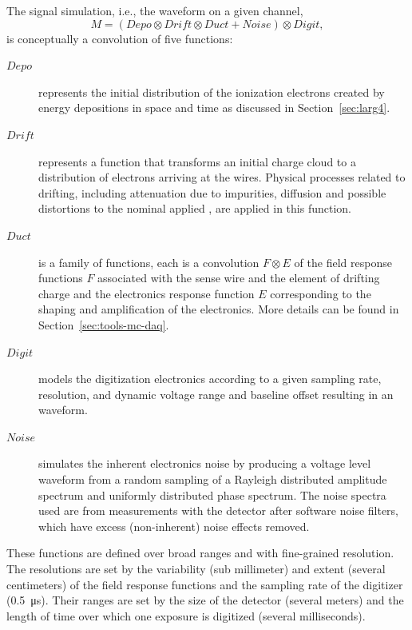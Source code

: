 The signal simulation, i.e., the  waveform on a given channel, 
\begin{equation}
  \label{eq:sim-convolution}
    M = (Depo \otimes Drift \otimes Duct + Noise) \otimes Digit, 
\end{equation}
is conceptually a convolution of five functions:
\begin{description}
\item[$Depo$] represents the initial distribution of the ionization electrons created by energy depositions in space and time as
discussed in Section~\ref{sec:larg4}.
\item[$Drift$] represents a function that transforms an initial charge cloud to a distribution of electrons arriving at the wires. Physical processes related to drifting, including attenuation due to impurities, diffusion and possible distortions to the nominal applied \efield, are applied in this function.
\item[$Duct$] is a family of functions, each is a convolution $F \otimes E$ of the field response functions $F$ associated with the sense wire and the element of drifting charge and the electronics response function $E$ corresponding to the shaping and amplification of the  electronics. More details can be found in Section~\ref{sec:tools-mc-daq}.
\item[$Digit$] models the digitization electronics according to a given sampling rate, resolution, and dynamic voltage range and baseline offset resulting in an  waveform. 
\item[$Noise$] simulates the inherent electronics noise by producing a voltage level waveform from a random sampling of a Rayleigh distributed amplitude spectrum and uniformly distributed phase spectrum.  The noise spectra used are from measurements with the  detector after software noise filters, which have excess (non-inherent) noise effects removed.
\end{description}
%
These functions are defined over broad ranges and with fine-grained resolution. The resolutions are set by the variability (sub millimeter) and extent (several centimeters) of the field response functions and the sampling rate of the digitizer (\SI{0.5}{\micro\second}). Their ranges are set by the size of the detector (several meters) and the length of time over which one exposure is digitized (several milliseconds).  


